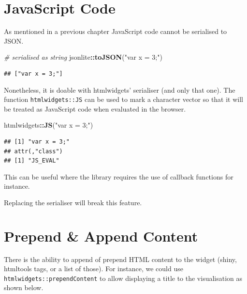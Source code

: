 \documentclass[
]{krantz}
\makeatletter
\newenvironment{Shaded}{\begin{snugshade}}{\end{snugshade}}
\newcommand{\CommentTok}[1]{\textcolor[rgb]{0.37,0.37,0.37}{\textit{#1}}}
\newcommand{\KeywordTok}[1]{\textcolor[rgb]{0.27,0.27,0.27}{\textbf{#1}}}
\newcommand{\NormalTok}[1]{#1}
\newcommand{\OperatorTok}[1]{\textcolor[rgb]{0.43,0.43,0.43}{\textbf{#1}}}
\newcommand{\StringTok}[1]{\textcolor[rgb]{0.5,0.5,0.5}{#1}}
\newenvironment{kframe}{%
\medskip{}
\setlength{\fboxsep}{.8em}
 \def\at@end@of@kframe{}%
 \ifinner\ifhmode%
  \def\at@end@of@kframe{\end{minipage}}%
  \begin{minipage}{\columnwidth}%
 \fi\fi%
 \def\FrameCommand##1{\hskip\@totalleftmargin \hskip-\fboxsep
 \colorbox{shadecolor}{##1}\hskip-\fboxsep
     \hskip-\linewidth \hskip-\@totalleftmargin \hskip\columnwidth}%
 \MakeFramed {\advance\hsize-\width
   \@totalleftmargin\z@ \linewidth\hsize
   \@setminipage}}%
 {\par\unskip\endMakeFramed%
 \at@end@of@kframe}
\renewenvironment{Shaded}{\begin{kframe}}{\end{kframe}}
\newenvironment{rmdblock}[1]
  {
  \begin{itemize}
  \renewcommand{\labelitemi}{
    \raisebox{-.7\height}[0pt][0pt]{
      {\setkeys{Gin}{width=3em,keepaspectratio}\texttt{[image: images/\#1]}}
    }
  }
  \setlength{\fboxsep}{1em}
  \begin{kframe}
  \item
  }
  {
  \end{kframe}
  \end{itemize}
  }
\newenvironment{rmdnote}
  {\begin{rmdblock}{note}}
  {\end{rmdblock}}
\makeatother
\begin{document}
\hypertarget{widgets-adv-js}{%
\section{JavaScript Code}\label{widgets-adv-js}}

As mentioned in a previous chapter JavaScript code cannot be serialised to JSON.

\begin{Shaded}
\begin{Highlighting}[]
\CommentTok{\# serialised as string}
\NormalTok{jsonlite}\OperatorTok{::}\KeywordTok{toJSON}\NormalTok{(}\StringTok{"var x = 3;"}\NormalTok{)}
\end{Highlighting}
\end{Shaded}

\begin{verbatim}
## ["var x = 3;"]
\end{verbatim}

Nonetheless, it is doable with htmlwidgets' serialiser (and only that one). The function \texttt{htmlwidgets::JS} can be used to mark a character vector so that it will be treated as JavaScript code when evaluated in the browser.

\begin{Shaded}
\begin{Highlighting}[]
\NormalTok{htmlwidgets}\OperatorTok{::}\KeywordTok{JS}\NormalTok{(}\StringTok{"var x = 3;"}\NormalTok{)  }
\end{Highlighting}
\end{Shaded}

\begin{verbatim}
## [1] "var x = 3;"
## attr(,"class")
## [1] "JS_EVAL"
\end{verbatim}

This can be useful where the library requires the use of callback functions for instance.

\begin{rmdnote}
Replacing the serialiser will break this feature.
\end{rmdnote}

\hypertarget{widgets-adv-prepend-append}{%
\section{Prepend \& Append Content}\label{widgets-adv-prepend-append}}

There is the ability to append of prepend HTML content to the widget (shiny, htmltools tags, or a list of those). For instance, we could use \texttt{htmlwidgets::prependContent} to allow displaying a title to the visualisation as shown below.
\end{document}
